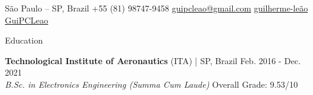 \documentclass{resume} %
\begin{document}
\vspace{-0.7cm}
\begin{center}
\faHome
    \hspace{0.1cm}
        São Paulo -- SP, Brazil
    \hspace{0.05cm}  \hspace{0.05cm}
\faMobile
    \hspace{0.1cm}
        +55 (81) 98747-9458
    \hspace{0.05cm}  \hspace{0.05cm}
\faEnvelope
    \hspace{0.1cm}
	\href{mailto:guipcleao@gmail.com}{guipcleao@gmail.com}
    \hspace{0.05cm}  \hspace{0.05cm}
\faLinkedinSquare
    \hspace{0.1cm}
        \href{https://www.linkedin.com/in/guilherme-le\%C3\%A3o}{guilherme-le\~{a}o}
    \hspace{0.05cm}  \hspace{0.05cm}
	\href{https://github.com/GuiPCLeao}{GuiPCLeao}
\end{center}


\vspace{-0.1cm}

\begin{rSection}{Education}

{\bf Technological Institute of Aeronautics} (ITA) | SP, Brazil \hfill Feb. 2016 - Dec. 2021
\\ {\em B.Sc. in Electronics Engineering (Summa Cum Laude)} \hfill { Overall Grade: 9.53/10}


\end{rSection}
\end{document}

